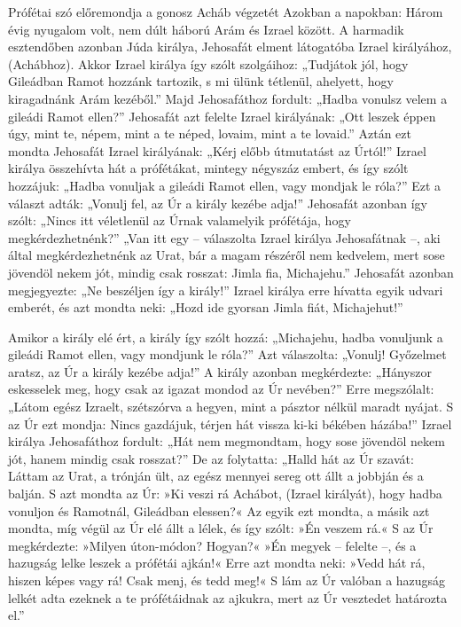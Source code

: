 \documentclass[twoside]{article}
\begin{document}
\begin{lectio}{Prófétai szó előremondja a gonosz Acháb végzetét}
\noindent Azokban a napokban: Három évig nyugalom volt, nem dúlt háború Arám és Izrael között. A harmadik esztendőben azonban Júda királya, Jehosafát elment látogatóba Izrael királyához, (Achábhoz). Akkor Izrael királya így szólt szolgáihoz: „Tudjátok jól, hogy Gileádban Ramot hozzánk tartozik, s mi ülünk tétlenül, ahelyett, hogy kiragadnánk Arám kezéből.” Majd Jehosafáthoz fordult: „Hadba vonulsz velem a gileádi Ramot ellen?” Jehosafát azt felelte Izrael királyának: „Ott leszek éppen úgy, mint te, népem, mint a te néped, lovaim, mint a te lovaid.” Aztán ezt mondta Jehosafát Izrael királyának: „Kérj előbb útmutatást az Úrtól!” Izrael királya összehívta hát a prófétákat, mintegy négyszáz embert, és így szólt hozzájuk: „Hadba vonuljak a gileádi Ramot ellen, vagy mondjak le róla?” Ezt a választ adták: „Vonulj fel, az Úr a király kezébe adja!” Jehosafát azonban így szólt: „Nincs itt véletlenül az Úrnak valamelyik prófétája, hogy megkérdezhetnénk?” „Van itt egy – válaszolta Izrael királya Jehosafátnak –, aki által megkérdezhetnénk az Urat, bár a magam részéről nem kedvelem, mert sose jövendöl nekem jót, mindig csak rosszat: Jimla fia, Michajehu.” Jehosafát azonban megjegyezte: „Ne beszéljen így a király!” Izrael királya erre hívatta egyik udvari emberét, és azt mondta neki: „Hozd ide gyorsan Jimla fiát, Michajehut!”

Amikor a király elé ért, a király így szólt hozzá: „Michajehu, hadba vonuljunk a gileádi Ramot ellen, vagy mondjunk le róla?” Azt válaszolta: „Vonulj! Győzelmet aratsz, az Úr a király kezébe adja!” A király azonban megkérdezte: „Hányszor eskesselek meg, hogy csak az igazat mondod az Úr nevében?” Erre megszólalt: „Látom egész Izraelt, szétszórva a hegyen, mint a pásztor nélkül maradt nyájat. S az Úr ezt mondja: Nincs gazdájuk, térjen hát vissza ki-ki békében házába!” Izrael királya Jehosafáthoz fordult: „Hát nem megmondtam, hogy sose jövendöl nekem jót, hanem mindig csak rosszat?” De az folytatta: „Halld hát az Úr szavát: Láttam az Urat, a trónján ült, az egész mennyei sereg ott állt a jobbján és a balján. S azt mondta az Úr: »Ki veszi rá Achábot, (Izrael királyát), hogy hadba vonuljon és Ramotnál, Gileádban elessen?« Az egyik ezt mondta, a másik azt mondta, míg végül az Úr elé állt a lélek, és így szólt: »Én veszem rá.« S az Úr megkérdezte: »Milyen úton-módon? Hogyan?« »Én megyek – felelte –, és a hazugság lelke leszek a prófétái ajkán!« Erre azt mondta neki: »Vedd hát rá, hiszen képes vagy rá! Csak menj, és tedd meg!« S lám az Úr valóban a hazugság lelkét adta ezeknek a te prófétáidnak az ajkukra, mert az Úr vesztedet határozta el.”


\end{lectio}
\end{document}

